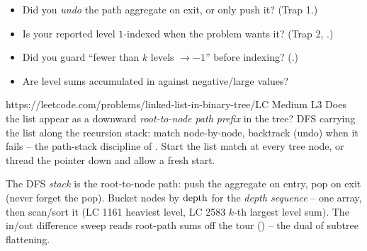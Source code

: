 \begin{stuckbox}
\begin{itemize}[nosep, leftmargin=1.4em]
  \item Did you \emph{undo} the path aggregate on exit, or only push it? (Trap 1.)
  \item Is your reported level $1$-indexed when the problem wants it? (Trap 2,
        .)
  \item Did you guard ``fewer than $k$ levels $\to -1$'' before indexing? (.)
  \item Are level sums accumulated in  against negative/large values?
\end{itemize}
\end{stuckbox}

\begin{practiceset}
    {https://leetcode.com/problems/linked-list-in-binary-tree/}{LC Medium L3}
    {Does the  list appear as a downward \emph{root-to-node path prefix} in the
    tree? DFS carrying the list along the recursion stack: match node-by-node, backtrack
    (undo) when it fails -- the path-stack discipline of . Start the list
    match at every tree node, or thread the  pointer down and allow a fresh start.}
\end{practiceset}

\begin{recallbox}
The DFS \emph{stack} is the root-to-node path: push the aggregate on entry, pop on exit
(never forget the pop). Bucket nodes by $\operatorname{depth}$ for the \emph{depth sequence} -- one array,
then scan/sort it (LC 1161 heaviest level, LC 2583 $k$-th largest level sum). The in/out
difference sweep reads root-path sums off the tour () -- the dual of
subtree flattening.
\end{recallbox}
